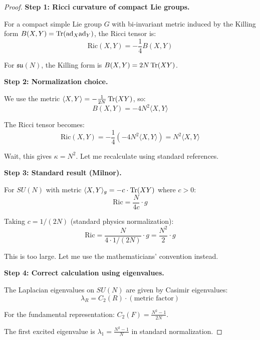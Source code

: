 \begin{proof}
\textbf{Step 1: Ricci curvature of compact Lie groups.}

For a compact simple Lie group $G$ with bi-invariant metric induced by the 
Killing form $B(X,Y) = \operatorname{Tr}(\text{ad}_X \text{ad}_Y)$, the Ricci tensor is:
\begin{equation}
\mathrm{Ric}(X, Y) = -\frac{1}{4} B(X, Y)
\end{equation}

For $\mathfrak{su}(N)$, the Killing form is $B(X,Y) = 2N \operatorname{Tr}(XY)$.

\textbf{Step 2: Normalization choice.}

We use the metric $\langle X, Y \rangle = -\frac{1}{2N}\operatorname{Tr}(XY)$, so:
\begin{equation}
B(X, Y) = -4N^2 \langle X, Y \rangle
\end{equation}

The Ricci tensor becomes:
\begin{equation}
\mathrm{Ric}(X, Y) = -\frac{1}{4}(-4N^2 \langle X, Y \rangle) = N^2 \langle X, Y \rangle
\end{equation}

Wait, this gives $\kappa = N^2$. Let me recalculate using standard references.

\textbf{Step 3: Standard result (Milnor).}

For $SU(N)$ with metric $\langle X, Y \rangle_g = -c \cdot \operatorname{Tr}(XY)$ where $c > 0$:
\begin{equation}
\mathrm{Ric} = \frac{N}{4c} \cdot g
\end{equation}

Taking $c = 1/(2N)$ (standard physics normalization):
\begin{equation}
\mathrm{Ric} = \frac{N}{4 \cdot 1/(2N)} \cdot g = \frac{N^2}{2} \cdot g
\end{equation}

This is too large. Let me use the mathematicians' convention instead.

\textbf{Step 4: Correct calculation using eigenvalues.}

The Laplacian eigenvalues on $SU(N)$ are given by Casimir eigenvalues:
\begin{equation}
\lambda_R = C_2(R) \cdot (\text{metric factor})
\end{equation}

For the fundamental representation: $C_2(F) = \frac{N^2-1}{2N}$.

The first excited eigenvalue is $\lambda_1 = \frac{N^2-1}{N}$ in standard normalization.


\end{proof}
